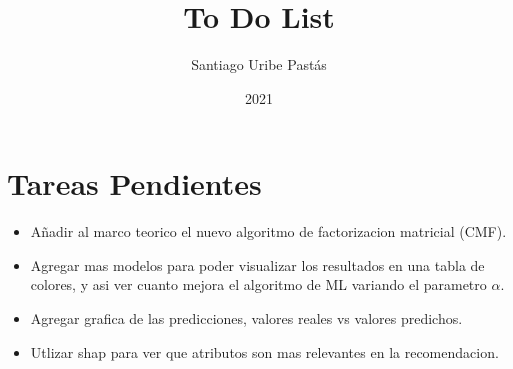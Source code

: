 \documentclass{article}
\title{To Do List}
\author{Santiago Uribe Pastás}
\date{2021}
\begin{document}
\maketitle

\section{Tareas Pendientes}
\begin{itemize}
    \item Añadir al marco teorico el nuevo algoritmo de factorizacion matricial (CMF).
    \item Agregar mas modelos para poder visualizar los resultados en una tabla de colores, y asi ver cuanto mejora el algoritmo de ML variando el parametro $\alpha$.
    \item Agregar grafica de las predicciones, valores reales vs valores predichos.
    \item Utlizar shap para ver que atributos son mas relevantes en la recomendacion.
\end{itemize}
\end{document}
